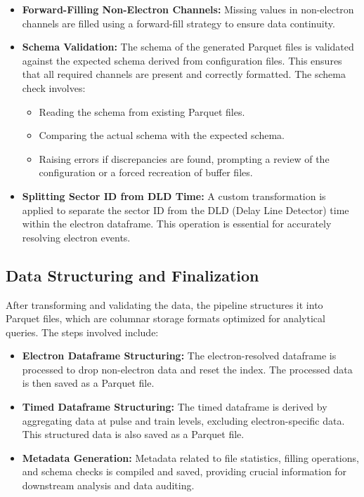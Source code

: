 \begin{itemize}
    \item \textbf{Forward-Filling Non-Electron Channels:} Missing values in non-electron channels are filled using a forward-fill strategy to ensure data continuity.
    \item \textbf{Schema Validation:} The schema of the generated Parquet files is validated against the expected schema derived from configuration files. This ensures that all required channels are present and correctly formatted. The schema check involves:
    \begin{itemize}
        \item Reading the schema from existing Parquet files.
        \item Comparing the actual schema with the expected schema.
        \item Raising errors if discrepancies are found, prompting a review of the configuration or a forced recreation of buffer files.
    \end{itemize}
    \item \textbf{Splitting Sector ID from DLD Time:} A custom transformation is applied to separate the sector ID from the DLD (Delay Line Detector) time within the electron dataframe. This operation is essential for accurately resolving electron events.
\end{itemize}

\subsection*{Data Structuring and Finalization}
After transforming and validating the data, the pipeline structures it into Parquet files, which are columnar storage formats optimized for analytical queries. The steps involved include:

\begin{itemize}
    \item \textbf{Electron Dataframe Structuring:} The electron-resolved dataframe is processed to drop non-electron data and reset the index. The processed data is then saved as a Parquet file.
    \item \textbf{Timed Dataframe Structuring:} The timed dataframe is derived by aggregating data at pulse and train levels, excluding electron-specific data. This structured data is also saved as a Parquet file.
    \item \textbf{Metadata Generation:} Metadata related to file statistics, filling operations, and schema checks is compiled and saved, providing crucial information for downstream analysis and data auditing.
\end{itemize}

